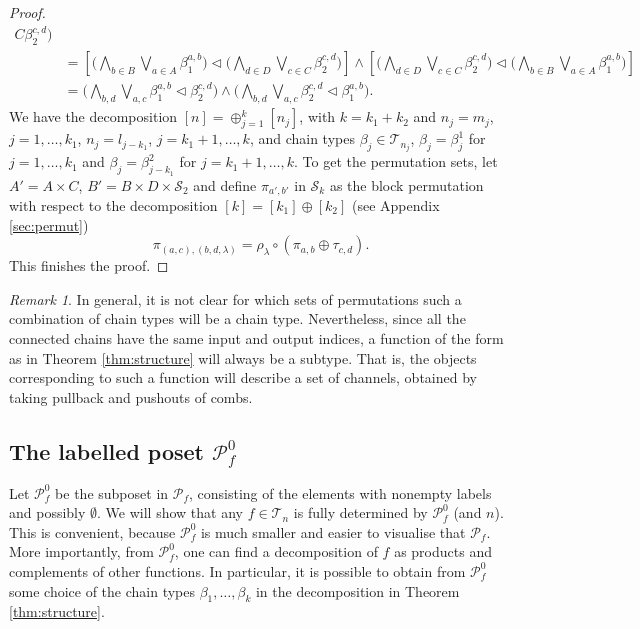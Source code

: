 \documentclass[12pt]{article}
\theoremstyle{definition}
\theoremstyle{remark}
\newtheorem{remark}{Remark}
\def\Te{\mathcal T}
\def\Pe{\mathcal P}
\def\permut{\mathscr{S}}
\def\vtl{\vartriangleleft}
\begin{document}
\begin{proof}
\begin{align*}
{C}\beta_2^{c,d}\bigr)\\
&=\left[\bigl(\bigwedge_{b\in B}\bigvee_{a\in A}\beta_1^{a,b}\bigr)\vtl \bigl(\bigwedge_{d\in D}\bigvee_{c\in
C}\beta_2^{c,d}\bigr)\right]\wedge \left[\bigl(\bigwedge_{d\in D}\bigvee_{c\in
C}\beta_2^{c,d}\bigr)\vtl\bigl(\bigwedge_{b\in B}\bigvee_{a\in A}\beta_1^{a,b}\bigr)
\right]\\
&= \bigl(\bigwedge_{b,d}\bigvee_{a,c} \beta_1^{a,b}\vtl \beta_2^{c,d}\bigr) \wedge
\bigl(\bigwedge_{b,d}\bigvee_{a,c} \beta_2^{c,d}\vtl \beta_1^{a,b}\bigr).
\end{align*}
We have the decomposition $[n]=\oplus_{j=1}^k[n_j]$, with $k=k_1+k_2$ and $n_j=m_j$,
$j=1,\dots, k_1$,  $n_j=l_{j-k_1}$, $j=k_1+1,\dots,k$, and chain types $\beta_j\in
\Te_{n_j}$, $\beta_j=\beta_j^1$ for $j=1,\dots,k_1$ and $\beta_j=\beta^2_{j-k_1}$ for
$j=k_1+1,\dots,k$. To get the permutation sets, let $A'=A\times C$, $B'=B\times D\times
\permut_2$ and define $\pi_{a',b'}$ in $\permut_k$ as the block permutation with respect to the
decomposition $[k]=[k_1]\oplus[k_2]$ (see Appendix \ref{sec:permut})
\[
\pi_{(a,c),(b,d,\lambda)}=\rho_\lambda\circ(\pi_{a,b}\oplus \tau_{c,d}).
\]
This  finishes the proof.

\end{proof}


\begin{remark} In general, it is not clear for which sets of permutations such a
combination of chain types will be a chain type. Nevertheless, since all the connected
chains have the same input and output indices, a function of the form as in Theorem
\ref{thm:structure} will always be a subtype. That is, the objects corresponding to such a
function will describe a set of channels, obtained by taking pullback and pushouts of
combs.

\end{remark}

\subsection{The labelled poset $\Pe_f^0$}

Let $\Pe_f^0$ be the subposet in $\Pe_f$, consisting of the elements with nonempty labels
and possibly $\emptyset$. We will show that any $f\in \Te_n$ is fully determined by $\Pe_f^0$ (and
$n$). This is convenient, because $\Pe_f^0$ is much smaller and easier to visualise that $\Pe_f$. More
importantly, from $\Pe_f^0$, one can find a  decomposition of $f$ as products and complements
of other functions. In particular, it is possible to obtain from $\Pe_f^0$ some choice of
the chain types  $\beta_1,\dots,\beta_k$
in the decomposition in Theorem \ref{thm:structure}.
\end{document}
